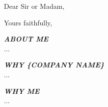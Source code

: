 \documentclass[11pt,a4paper]{moderncv}
\begin{document}
\date{\today}
\opening{Dear Sir or Madam,}
\closing{Yours faithfully,}
\makelettertitle

\textbf{\textit{ABOUT ME}}\\
...

\bigskip

\textbf{\textit{WHY \{COMPANY NAME\}}}\\
...

\bigskip

\textbf{\textit{WHY ME}}\\
...

\bigskip

\makeletterclosing
\end{document}
